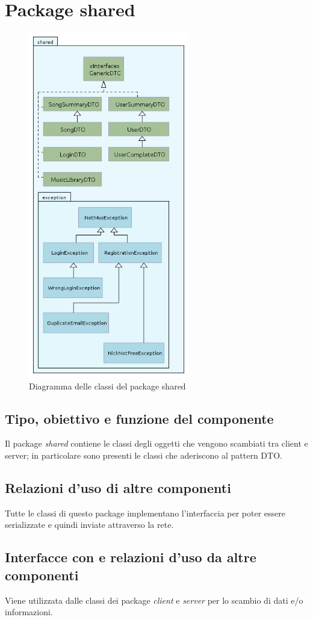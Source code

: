 \section{Package shared} %
\begin{figure}[h]
  \centering
  \includegraphics[width=7cm]{img/ST/Shared.png}
\caption{Diagramma delle classi del package shared}
\end{figure}
\subsection*{Tipo, obiettivo e funzione del componente}
Il package \emph{shared} contiene le classi degli oggetti che vengono
scambiati tra client e server; in particolare sono presenti le classi che
aderiscono al pattern DTO.
\subsection*{Relazioni d'uso di altre componenti}
Tutte le classi di questo package implementano l'interfaccia
 per poter essere serializzate e quindi inviate
attraverso la rete. 
\subsection*{Interfacce con e relazioni d'uso da altre componenti}
Viene utilizzata dalle classi dei package \emph{client} e \emph{server} per
lo scambio di dati e/o informazioni.
